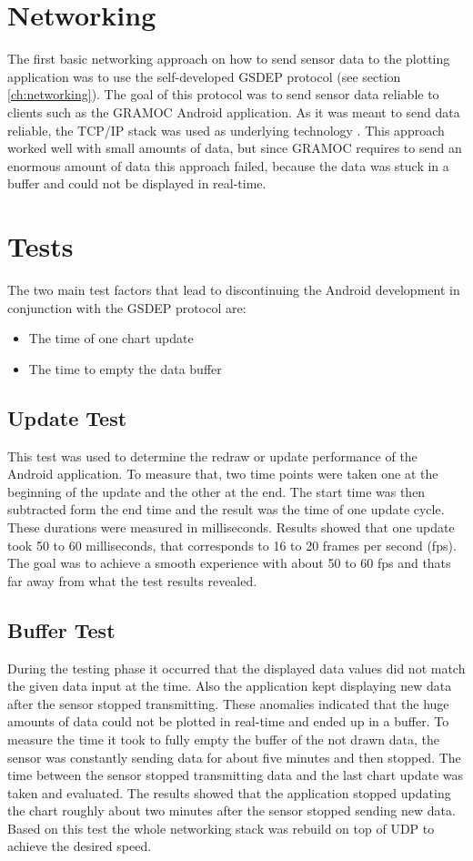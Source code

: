 \section{Networking}
The first basic networking approach on how to send sensor data to the plotting application was to use the self-developed GSDEP protocol (see section \vref{ch:networking}). The goal of this protocol was to send sensor data reliable to clients such as the GRAMOC Android application. As it was meant to send data reliable, the TCP/IP stack was used as underlying technology \cite{rfc793, rfc791}. This approach worked well with small amounts of data, but since GRAMOC requires to send an enormous amount of data this approach failed, because the data was stuck in a buffer and could not be displayed in real-time.

\section{Tests}
\label{sec:Tests}
The two main test factors that lead to discontinuing the Android development in conjunction with the GSDEP protocol are:

\begin{itemize}
    \item The time of one chart update
    \item The time to empty the data buffer
\end{itemize}

\subsection{Update Test}
This test was used to determine the redraw or update performance of the Android application. To measure that, two time points were taken one at the beginning of the update and the other at the end. The start time was then subtracted form the end time and the result was the time of one update cycle. These durations were measured in milliseconds. Results showed that one update took 50 to 60 milliseconds, that corresponds to 16 to 20 frames per second (fps). The goal was to achieve a smooth experience with about 50 to 60 fps and thats far away from what the test results revealed.

\subsection{Buffer Test}
During the testing phase it occurred that the displayed data values did not match the given data input at the time. Also the application kept displaying new data after the sensor stopped transmitting. These anomalies indicated that the huge amounts of data could not be plotted in real-time and ended up in a buffer. To measure the time it took to fully empty the buffer of the not drawn data, the sensor was constantly sending data for about five minutes and then stopped. The time between the sensor stopped transmitting data and the last chart update was taken and evaluated. The results showed that the application stopped updating the chart roughly about two minutes after the sensor stopped sending new data. Based on this test the whole networking stack was rebuild on top of UDP to achieve the desired speed.

